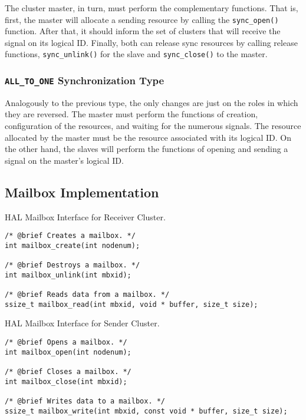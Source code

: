 					The cluster master, in turn, must perform the complementary functions.
					That is, first, the master will allocate a sending resource by calling
					the \texttt{sync\_open()} function.
					After that, it should inform the set of clusters that will receive the
					signal on its logical ID.
					Finally, both can release sync resources by calling release functions,
					\texttt{sync\_unlink()} for the slave and \texttt{sync\_close()} to
					the master.

				\subsubsection*{\texttt{ALL\_TO\_ONE} Synchronization Type}

					Analogously to the previous type, the only changes are just on
					the roles in which they are reversed.
					The master must perform the functions of creation, configuration
					of the resources, and waiting for the numerous signals.
					The resource allocated by the master must be the resource
					associated with its logical ID.
					On the other hand, the slaves will perform the functions of
					opening and sending a signal on the master's logical ID.

		\subsection*{Mailbox Implementation}


\begin{listing}[t]
\caption{HAL Mailbox Interface for Receiver Cluster.}
\label{code:mailbox-receiver}
\begin{verbatim}
/* @brief Creates a mailbox. */
int mailbox_create(int nodenum);

/* @brief Destroys a mailbox. */
int mailbox_unlink(int mbxid);

/* @brief Reads data from a mailbox. */
ssize_t mailbox_read(int mbxid, void * buffer, size_t size);
\end{verbatim}
\end{listing}

\begin{listing}[t]
\caption{HAL Mailbox Interface for Sender Cluster.}
\label{code:mailbox-sender}
\begin{verbatim}
/* @brief Opens a mailbox. */
int mailbox_open(int nodenum);

/* @brief Closes a mailbox. */
int mailbox_close(int mbxid);

/* @brief Writes data to a mailbox. */
ssize_t mailbox_write(int mbxid, const void * buffer, size_t size);
\end{verbatim}
\end{listing}

